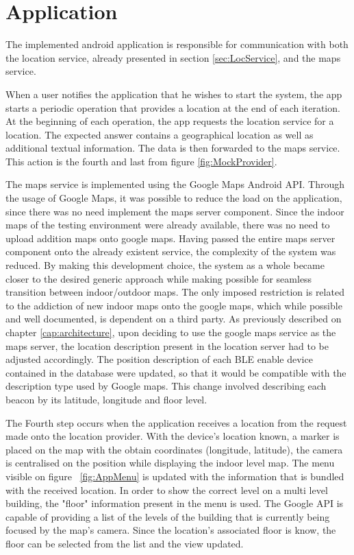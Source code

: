 \section{Application} 
\label{sec:app} 
 
 
The implemented android application is responsible for communication with both the location service, already presented in section \ref{sec:LocService}, and the maps service. 
 
 
When a user notifies the application that he wishes to start the system, the app starts a periodic operation that provides a location at the end of each iteration. At the beginning of each operation, the app requests the location service for a location. The expected answer contains a geographical location as well as additional  textual information. The data is then forwarded to the maps service. This action is the fourth and last from figure \ref{fig:MockProvider}. 
 
 
The maps service is implemented using the Google Maps Android API. Through the usage of Google Maps, it was possible to reduce the load on the application, since there was no need implement the maps server component. Since the indoor maps of the testing environment were already available, there was no need to upload addition maps onto google maps. Having passed the entire maps server component onto the already existent service, the complexity of the system was reduced. By making this development choice, the system as a whole became closer to the desired generic approach while making possible for seamless transition between indoor/outdoor maps. The only imposed restriction is related to the addiction of new indoor maps onto the google maps, which while possible and well documented, is dependent on a third party. As previously described on chapter \ref{cap:architecture}, upon deciding to use the google maps service as the maps server, the location description present in the location server had to be adjusted accordingly. The position description of each \ac{BLE} enable device contained in the database were updated, so that it would be compatible with the description type used by Google maps. This change involved describing each beacon by its latitude, longitude and floor level. 
 
 
The Fourth step occurs when the application receives a location from the request made onto the location provider. With the device's location known, a marker is placed on the map with the obtain coordinates (longitude, latitude), the camera is centralised on the position while displaying the indoor level map. The menu visible on figure ~\ref{fig:AppMenu} is updated with the information that is bundled with the received location. In order to show the correct level on a multi level building, the "floor" information present in the menu is used. The Google API is capable of providing a list of the levels of the building that is currently being focused by the map's camera. Since the location's associated floor is know, the floor can be selected from the list and the view updated. 
 
